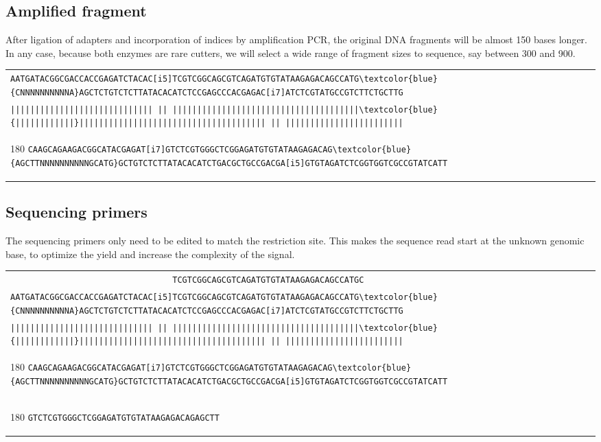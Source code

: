 \documentclass[a4paper,12pt]{article}
\begin{document}
\begin{flushleft}
\subsection*{Amplified fragment}
After ligation of adapters and incorporation of indices by amplification PCR, the original DNA fragments will be almost 150 bases longer. In any case, because both enzymes are rare cutters, we will select a wide range of fragment sizes to sequence, say between 300 and 900.

\begin{tabular}{l}
\Verb+AATGATACGGCGACCACCGAGATCTACAC[i5]TCGTCGGCAGCGTCAGATGTGTATAAGAGACAGCCATG\textcolor{blue}{CNNNNNNNNNNA}AGCTCTGTCTCTTATACACATCTCCGAGCCCACGAGAC[i7]ATCTCGTATGCCGTCTTCTGCTTG+\\[-8pt]
\Verb+||||||||||||||||||||||||||||| || ||||||||||||||||||||||||||||||||||||||\textcolor{blue}{||||||||||||}|||||||||||||||||||||||||||||||||||||| || ||||||||||||||||||||||||+\\[-10pt]
\begin{turn}{180}
\Verb+CAAGCAGAAGACGGCATACGAGAT[i7]GTCTCGTGGGCTCGGAGATGTGTATAAGAGACAG\textcolor{blue}{AGCTTNNNNNNNNNNGCATG}GCTGTCTCTTATACACATCTGACGCTGCCGACGA[i5]GTGTAGATCTCGGTGGTCGCCGTATCATT+
\end{turn}
\\
\end{tabular}

\subsection*{Sequencing primers}
The sequencing primers only need to be edited to match the restriction site. This makes the sequence read start at the unknown genomic base, to optimize the yield and increase the complexity of the signal.

\begin{tabular}{l}
\Verb+                                 TCGTCGGCAGCGTCAGATGTGTATAAGAGACAGCCATGC+\\[-8pt]
\Verb+AATGATACGGCGACCACCGAGATCTACAC[i5]TCGTCGGCAGCGTCAGATGTGTATAAGAGACAGCCATG\textcolor{blue}{CNNNNNNNNNNA}AGCTCTGTCTCTTATACACATCTCCGAGCCCACGAGAC[i7]ATCTCGTATGCCGTCTTCTGCTTG+\\[-8pt]
\Verb+||||||||||||||||||||||||||||| || ||||||||||||||||||||||||||||||||||||||\textcolor{blue}{||||||||||||}|||||||||||||||||||||||||||||||||||||| || ||||||||||||||||||||||||+\\[-10pt]
\begin{turn}{180}
   \Verb+CAAGCAGAAGACGGCATACGAGAT[i7]GTCTCGTGGGCTCGGAGATGTGTATAAGAGACAG\textcolor{blue}{AGCTTNNNNNNNNNNGCATG}GCTGTCTCTTATACACATCTGACGCTGCCGACGA[i5]GTGTAGATCTCGGTGGTCGCCGTATCATT+
\end{turn}
\\[-8pt]
\begin{turn}{180}
   \Verb+GTCTCGTGGGCTCGGAGATGTGTATAAGAGACAGAGCTT                                                                                  +
\end{turn}
\\
\end{tabular}



\end{flushleft}
 
\end{document}
